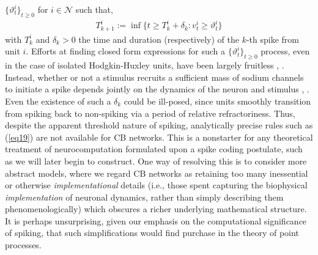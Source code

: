 \documentclass[12pt, oneside]{report}
\newcommand{\1}[1]{\mathbbm{1}_{\{#1\}}}
\newcommand{\mc}[1]{\mathcal{#1}}
\theoremstyle{definition}
\begin{document}
$\{\vartheta^i_t\}_{t\geq 0}$ for $i\in\mc{N}$ such that,
\begin{align}
    T^i_{k+1}:=\inf\{t\geq T^i_k+\delta_k:v^i_t\geq\vartheta^i_t\}\label{eq19}
\end{align}
with $T^i_k$ and $\delta_k>0$ the time and duration (respectively) of the $k$-th spike from
unit $i$. Efforts at finding closed form expressions for such a $\{\vartheta^i_t\}_{t\geq 0}$ process, even
in the case of isolated Hodgkin-Huxley units, have been largely fruitless \cite{Platkiewicz_Brette_2010}, \cite{Wang_Wang_Yu_Chen_2016}.
Instead, whether or not a stimulus recruits a
sufficient mass of sodium channels to initiate a spike depends jointly on the
dynamics of the neuron and stimulus \cite{Koch_Bernander_Douglas_1995}, \cite{Rinzel_Ermentrout_1998}.
Even the existence of such a $\delta_k$ could be ill-posed, since units smoothly transition from
spiking back to non-spiking via a period of relative refractoriness. Thus,
despite the apparent threshold nature of spiking, analytically precise rules such as (\ref{eq19}) are not available for CB networks.
This is a nonstarter for any theoretical treatment of neurocomputation formulated upon a spike coding postulate, such as we will later begin to construct. 
One way of resolving this is to consider more abstract models, where we regard CB networks as retaining too many inessential or otherwise \textit{implementational} details (i.e.,
those spent capturing the biophysical \textit{implementation} of neuronal dynamics, rather than simply describing them phenomenologically) which obscures
a richer underlying mathematical structure. It is perhaps unsurprising, given our emphasis on the computational significance of spiking,
that such simplifications would find purchase in the theory of point processes.
\end{document}

